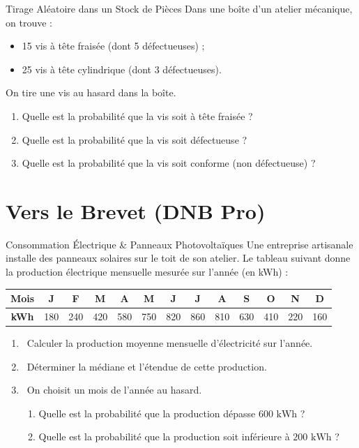 \begin{exercice}[4 pts]{\capRealiser}{Tirage Aléatoire dans un Stock de Pièces}
Dans une boîte d'un atelier mécanique, on trouve :
\begin{itemize}
    \item 15 vis à tête fraisée (dont 5 défectueuses) ;
    \item 25 vis à tête cylindrique (dont 3 défectueuses).
\end{itemize}
On tire une vis au hasard dans la boîte.
\begin{enumerate}
    \item Quelle est la probabilité que la vis soit à tête fraisée ?
    \item Quelle est la probabilité que la vis soit défectueuse ?
    \item Quelle est la probabilité que la vis soit conforme (non défectueuse) ?
\end{enumerate}
\lignesreponse[5]
\end{exercice}

\section{Vers le Brevet (DNB Pro)}

\begin{sujetdnb}{Consommation Électrique \& Panneaux Photovoltaïques}
Une entreprise artisanale installe des panneaux solaires sur le toit de son atelier.
Le tableau suivant donne la production électrique mensuelle mesurée sur l'année (en kWh) :

\begin{center}
\begin{tabular}{|c|c|c|c|c|c|c|c|c|c|c|c|c|}
\hline
\rowcolor{slate200} \textbf{Mois} & J & F & M & A & M & J & J & A & S & O & N & D \\
\hline
\textbf{kWh} & 180 & 240 & 420 & 580 & 750 & 820 & 860 & 810 & 630 & 410 & 220 & 160 \\
\hline
\end{tabular}
\end{center}

\begin{enumerate}
    \item \capRealiser\ Calculer la production moyenne mensuelle d'électricité sur l'année.
    \item \capRealiser\ Déterminer la médiane et l'étendue de cette production.
    \item \capAnalyser\ On choisit un mois de l'année au hasard.
    \begin{enumerate}
        \item Quelle est la probabilité que la production dépasse $600\text{ kWh}$ ?
        \item Quelle est la probabilité que la production soit inférieure à $200\text{ kWh}$ ?
    \end{enumerate}
\end{enumerate}
\lignesreponse[6]
\end{sujetdnb}

